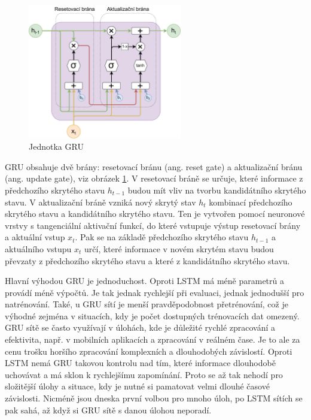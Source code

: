 \begin{figure}
    \centering
    \includegraphics[width=0.6\textwidth]{Figures/GRU_unit.pdf}
    \caption{Jednotka GRU}
    \label{fig:gru_unit}
\end{figure}

GRU obsahuje dvě brány: resetovací bránu (ang. reset gate) a aktualizační bránu
(ang. update gate), viz obrázek \ref{fig:gru_unit}. V resetovací bráně se
určuje, které informace z předchozího skrytého stavu $h_{t-1}$ budou mít vliv
na tvorbu kandidátního skrytého stavu. V aktualizační bráně vzniká nový skrytý
stav $h_t$ kombinací předchozího skrytého stavu a kandidátního skrytého stavu.
Ten je vytvořen pomocí neuronové vrstvy s tangenciální aktivační funkcí, do
které vstupuje výstup resetovací brány a aktuální vstup $x_t$. Pak se na
základě předchozího skrytého stavu $h_{t-1}$ a aktuálního vstupu $x_t$ určí,
které informace v novém skrytém stavu budou převzaty z předchozího skrytého
stavu a které z kandidátního skrytého stavu.

Hlavní výhodou GRU je jednoduchost. Oproti LSTM má méně parametrů a provádí
méně výpočtů. Je tak jednak rychlejší při evaluaci, jednak jednodušší pro
natrénování. Také, u GRU sítí je menší pravděpodobnost přetrénování, což je
výhodné zejména v situacích, kdy je počet dostupných trénovacích dat omezený. GRU
sítě se často využívají v úlohách, kde je důležité rychlé zpracování a
efektivita, např. v mobilních aplikacích a zpracování v reálném čase. Je to ale
za cenu trošku horšího zpracování komplexních a dlouhodobých závislostí. Oproti
LSTM nemá GRU takovou kontrolu nad tím, které informace dlouhodobě uchovávat a
má sklon k rychlejšímu zapomínání. Proto se až tak nehodí pro složitější úlohy
a situace, kdy je nutné si pamatovat velmi dlouhé časové závislosti. Nicméně
jsou dneska první volbou pro mnoho úloh, po LSTM sítích se pak sahá, až když si
GRU sítě s danou úlohou neporadí.

\endinput